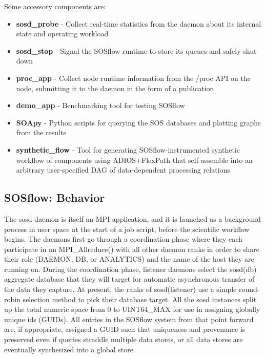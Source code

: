 Some accessory components are:
%
\begin{itemize}
    \item \textbf{sosd\_probe} - Collect real-time statistics from the daemon about
      its internal state and operating workload
    \item \textbf{sosd\_stop} - Signal the SOSflow runtime to store its queues and
      safely shut down
    \item \textbf{proc\_app} - Collect node runtime information from
      the /proc API on the node, submitting it to the daemon in the
      form of a publication
    \item \textbf{demo\_app} - Benchmarking tool for testing SOSflow
    \item \textbf{SOApy} - Python scripts for querying the SOS databases and plotting
      graphs from the results
    \item \textbf{synthetic\_flow} - Tool for generating SOSflow-instrumented
      synthetic workflow of components using ADIOS+FlexPath
      that self-assemble into an arbitrary  user-specified DAG of
      data-dependent processing relations
\end{itemize}

\subsection{SOSflow: Behavior}
The sosd daemon is itself an MPI application, and it is launched as a
background process in user space at the start of a job script, before
the scientific workflow begins.
%
The daemons first go through a coordination phase where they each
participate in an MPI\_Allreduce() with all other daemon ranks in
order to share their role (DAEMON, DB, or ANALYTICS) and the name of
the host they are running on.
%
During the coordination phase, listener daemons select the sosd(db)
aggregate database that they will target for automatic asynchronous
transfer of the data they capture.
%
At present, the ranks of sosd(listener) use a simple round-robin
selection method to pick their database target.
%
All the sosd instances split up the total numeric space from 0 to
UINT64\_MAX for use in assigning globally unique ids (GUIDs).
%
All entries in the SOSflow system from that point forward are, if
appropriate, assigned a GUID such that uniqueness and provenance is
preserved even if queries straddle multiple data stores, or all data
stores are eventually synthesized into a global store.

